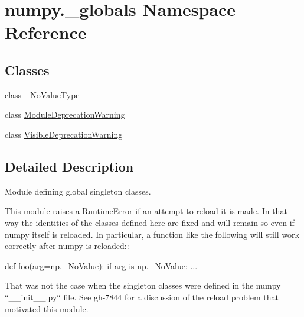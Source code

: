 \hypertarget{namespacenumpy_1_1__globals}{}\section{numpy.\+\_\+globals Namespace Reference}
\label{namespacenumpy_1_1__globals}
\subsection*{Classes}
\begin{DoxyCompactItemize}
\item 
class \hyperlink{classnumpy_1_1__globals_1_1__NoValueType}{\+\_\+\+No\+Value\+Type}
\item 
class \hyperlink{classnumpy_1_1__globals_1_1ModuleDeprecationWarning}{Module\+Deprecation\+Warning}
\item 
class \hyperlink{classnumpy_1_1__globals_1_1VisibleDeprecationWarning}{Visible\+Deprecation\+Warning}
\end{DoxyCompactItemize}


\subsection{Detailed Description}
\begin{DoxyVerb}Module defining global singleton classes.

This module raises a RuntimeError if an attempt to reload it is made. In that
way the identities of the classes defined here are fixed and will remain so
even if numpy itself is reloaded. In particular, a function like the following
will still work correctly after numpy is reloaded::

def foo(arg=np._NoValue):
    if arg is np._NoValue:
        ...

That was not the case when the singleton classes were defined in the numpy
``__init__.py`` file. See gh-7844 for a discussion of the reload problem that
motivated this module.\end{DoxyVerb}
 